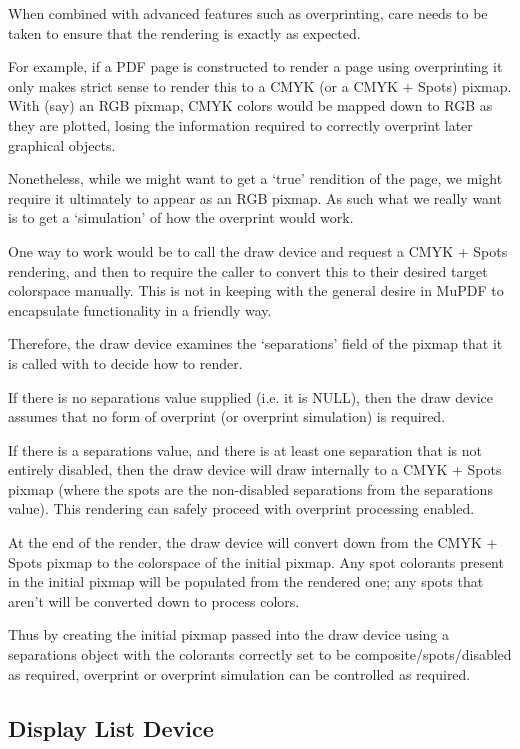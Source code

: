 \documentclass[oneside]{book}
\begin{document}
When combined with advanced features such as overprinting, care needs to be taken to ensure that the rendering is exactly as expected.

For example, if a PDF page is constructed to render a page using overprinting it only makes strict sense to render this to a CMYK (or a CMYK + Spots) pixmap. With (say) an RGB pixmap, CMYK colors would be mapped down to RGB as they are plotted, losing the information required to correctly overprint later graphical objects.

Nonetheless, while we might want to get a `true' rendition of the page, we might require it ultimately to appear as an RGB pixmap. As such what we really want is to get a `simulation' of how the overprint would work.

One way to work would be to call the draw device and request a CMYK + Spots rendering, and then to require the caller to convert this to their desired target colorspace manually. This is not in keeping with the general desire in MuPDF to encapsulate functionality in a friendly way.

Therefore, the draw device examines the `separations' field of the pixmap that it is called with to decide how to render.

If there is no separations value supplied (i.e. it is NULL), then the draw device assumes that no form of overprint (or overprint simulation) is required.

If there is a separations value, and there is at least one separation that is not entirely disabled, then the draw device will draw internally to a CMYK + Spots pixmap (where the spots are the non-disabled separations from the separations value). This rendering can safely proceed with overprint processing enabled.

At the end of the render, the draw device will convert down from the CMYK + Spots pixmap to the colorspace of the initial pixmap. Any spot colorants present in the initial pixmap will be populated from the rendered one; any spots that aren't will be converted down to process colors.

Thus by creating the initial pixmap passed into the draw device using a separations object with the colorants correctly set to be composite/spots/disabled as required, overprint or overprint simulation can be controlled as required.

\subsection{Display List Device}
\label{DisplayListDevice}
\end{document}
